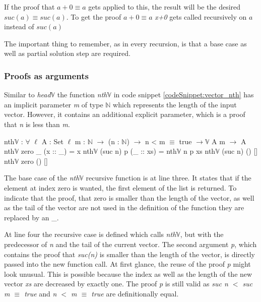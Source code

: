 If the proof that $a + 0 \equiv a$ gets applied to this, the result will be the desired $suc(a) \equiv suc(a)$. 
To get the proof $a + 0 \equiv a$ \emph{x+0} gets called recursively on $a$ instead of $suc(a)$

The important thing to remember, as in every recursion, is that a base case as well as partial solution step are required.

\subsubsection{Proofs as arguments}

Similar to \emph{head$\mathbb{V}$} the function \emph{nth$\mathbb{V}$} in code snippet \ref{codeSnippet:vector_nth} has an implicit parameter \emph{m} of type $\mathbb{N}$ which represents the length of the input vector. 
However, it contains an additional explicit parameter, which is a proof that \emph{n} is less than \emph{m}.

\begin{codesnippet}[mathescape=true, caption={Definition of \emph{nth} function in Agda}, label={codeSnippet:vector_nth}]
nth$\mathbb{V}$ : $\forall$ {$\ell$} {A : Set $\ell$} {m : $\mathbb{N}$} $\rightarrow$
       (n : $\mathbb{N}$) $\rightarrow$ n < m $\equiv$ true $\rightarrow \mathbb{V}$ A m $\rightarrow$ A
nth$\mathbb{V}$ zero _ (x :: _) = x
nth$\mathbb{V}$ (suc n) p (_ :: xs) = nth$\mathbb{V}$ n p xs
nth$\mathbb{V}$ (suc n) () []
nth$\mathbb{V}$ zero () []
\end{codesnippet}

The base case of the \emph{nth$\mathbb{V}$} recursive function is at line three. It states that if the element at index zero is wanted, the first element of the list is returned.
To indicate that the proof, that zero is smaller than the length of the vector, as well as the tail of the vector are not used in the definition of the function they are replaced by an \_.

At line four the recursive case is defined which calls \emph{nth$\mathbb{V}$}, but with the predecessor of \emph{n} and the tail of the current vector.
The second argument \emph{p}, which contains the proof that \emph{suc(n)} is smaller than the length of the vector, is directly passed into the new function call. 
At first glance, the reuse of the proof \emph{p} might look unusual. 
This is possible because the index as well as the length of the new vector \emph{xs} are decreased by exactly one.
The proof \emph{p} is still valid as \emph{suc n $<$ suc m $\equiv$ true} and \emph{n $<$ m $\equiv$ true} are definitionally equal.

